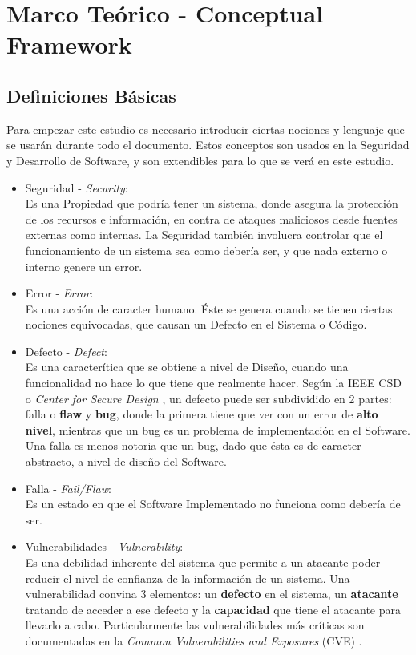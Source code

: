 \chapter{Marco Teórico - Conceptual Framework}
\label{chap2:FC}


\section{Definiciones Básicas}
\label{chap2:Def}

Para empezar este estudio es necesario introducir ciertas nociones y lenguaje que se usarán durante todo el documento. Estos conceptos son usados en la Seguridad y Desarrollo de Software, y son extendibles para lo que se verá en este estudio.

\begin{itemize}
    \item Seguridad - \textit{Security}:
        \\Es una Propiedad que podría tener un sistema, donde asegura la protección de los recursos e información, en contra de ataques maliciosos desde fuentes externas como internas. La Seguridad también involucra controlar que el funcionamiento de un sistema sea como debería ser, y que nada externo o interno genere un error.
    \item Error - \textit{Error}:
        \\Es una acción de caracter humano. Éste se genera cuando se tienen ciertas nociones equivocadas, que causan un Defecto en el Sistema o Código.
    \item Defecto  - \textit{Defect}:
        \\Es una caracterítica que se obtiene a nivel de Diseño, cuando una funcionalidad no hace lo que tiene que realmente hacer. Según la IEEE CSD o \textit{Center for Secure Design} \cite{ieeecsd2}, un defecto puede ser subdividido en 2 partes: falla o \textbf{flaw} y \textbf{bug}, donde la primera tiene que ver con un error de \textbf{alto nivel}, mientras que un bug es un problema de implementación en el Software. Una falla es menos notoria que un bug, dado que ésta es de caracter abstracto, a nivel de diseño del Software.
    \item Falla - \textit{Fail/Flaw}:
        \\Es un estado en que el Software Implementado no funciona como debería de ser.
    \item Vulnerabilidades - \textit{Vulnerability}:
        \\Es una debilidad inherente del sistema que permite a un atacante poder reducir el nivel de confianza de la información de un sistema. Una vulnerabilidad convina 3 elementos: un \textbf{defecto} en el sistema, un \textbf{atacante} tratando de acceder a ese defecto y la \textbf{capacidad} que tiene el atacante para llevarlo a cabo. Particularmente las vulnerabilidades más críticas son documentadas en la \textit{Common Vulnerabilities and Exposures} (CVE) \cite{cve}.

\end{itemize}
